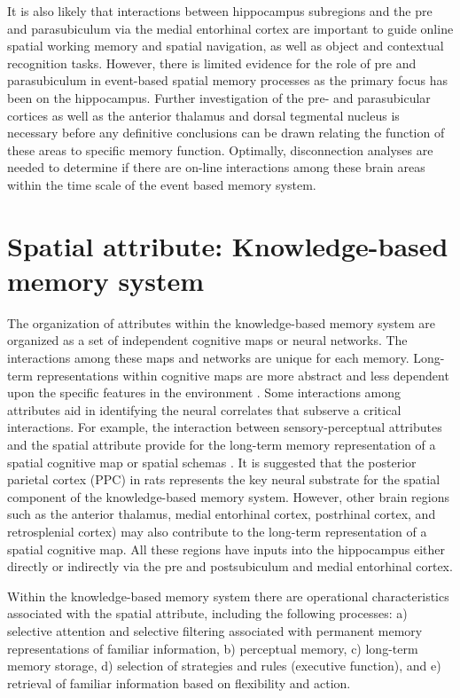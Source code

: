 \documentclass[doc, longtable]{apa6}
\begin{document}
It is also likely that interactions between hippocampus subregions and the pre and parasubiculum via the medial entorhinal cortex are important to guide online spatial working memory and spatial navigation, as well as object and contextual recognition tasks. However, there is limited evidence for the role of pre and parasubiculum in event-based spatial memory processes as the primary focus has been on the hippocampus. Further investigation of the pre- and parasubicular cortices as well as the anterior thalamus and dorsal tegmental nucleus is necessary before any definitive conclusions can be drawn relating the function of these areas to specific memory function. Optimally, disconnection analyses are needed to determine if there are on-line interactions among these brain areas within the time scale of the event based memory system.

\section{Spatial attribute: Knowledge-based memory system}
The organization of attributes within the knowledge-based memory system are organized as a set of independent cognitive maps or neural networks. The interactions among these maps and networks are unique for each memory. Long-term representations within cognitive maps are more abstract and less dependent upon the specific features in the environment \cite{kesner2004analysis}. Some interactions among attributes aid in identifying the neural correlates that subserve a critical interactions. For example, the interaction between sensory-perceptual attributes and the spatial attribute provide for the long-term memory representation of a spatial cognitive map or spatial schemas \parencite{Kesner2013e}. It is suggested that the posterior parietal cortex (PPC) in rats represents the key neural substrate for the spatial component of the knowledge-based memory system. However, other brain regions such as the anterior thalamus, medial entorhinal cortex, postrhinal cortex, and retrosplenial cortex) may also contribute to the long-term representation of a spatial cognitive map. All these regions have inputs into the hippocampus either directly or indirectly via the pre and postsubiculum and medial entorhinal cortex.
 
Within the knowledge-based memory system there are operational characteristics associated with the spatial attribute, including the following processes: a) selective attention and selective filtering associated with permanent memory representations of familiar information, b) perceptual memory, c) long-term memory storage, d) selection of strategies and rules (executive function), and e) retrieval of familiar information based on flexibility and action.
\end{document}

